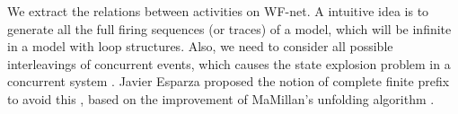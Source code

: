 \documentclass{llncs}
\begin{document}
We extract the relations between activities on WF-net. A intuitive idea is to generate all the full firing sequences (or traces) of a model, which will be infinite in a model with loop structures. Also, we need to consider all possible interleavings of concurrent events, which causes the state explosion problem in a concurrent system \cite{mcmillan1995technique}. Javier Esparza proposed the notion of complete finite prefix to avoid this \cite{esparza1996improvement}, based on the improvement of MaMillan's unfolding algorithm \cite{mcmillan1995technique}.










\end{document}
